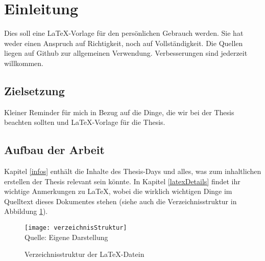 \section{Einleitung}
Dies soll eine \LaTeX{}-Vorlage für den persönlichen Gebrauch werden. Sie hat weder einen Anspruch auf Richtigkeit, noch auf Vollständigkeit. Die Quellen liegen auf Github zur allgemeinen Verwendung. Verbesserungen sind jederzeit willkommen.

\subsection{Zielsetzung}
Kleiner Reminder für mich in Bezug auf die Dinge, die wir bei der Thesis beachten sollten und \LaTeX{}-Vorlage für die Thesis.

\subsection{Aufbau der Arbeit}
Kapitel \ref{infos} enthält die Inhalte des Thesis-Days und alles, was zum inhaltlichen erstellen der Thesis relevant sein könnte. In Kapitel \ref{latexDetails}  findet ihr wichtige Anmerkungen zu \LaTeX{}, wobei die wirklich wichtigen Dinge im Quelltext dieses Dokumentes stehen (siehe auch die Verzeichnisstruktur in Abbildung \ref{fig:verzeichnisStruktur}).


\begin{figure}[H]
\caption{Verzeichnisstruktur der \LaTeX{}-Datein}\label{fig:verzeichnisStruktur}
\texttt{[image: verzeichnisStruktur]}
\\
Quelle: Eigene Darstellung
\end{figure}

